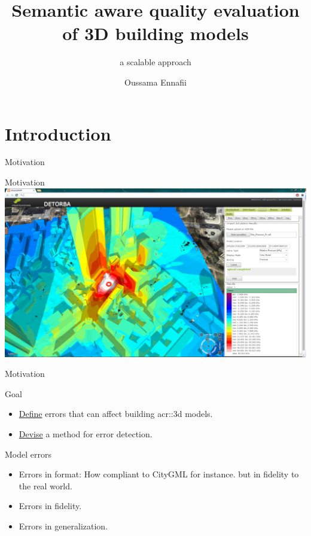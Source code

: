 \documentclass[10pt]{beamer}
\title{Semantic aware quality evaluation of 3D building models}
\subtitle{a scalable approach}
\date{\tiny \DTMdisplaydate{2020}{1}{10}{5}}
\author{
    Oussama Ennafii
}
\begin{document}
    \begin{frame}[plain]
        \titlepage{}
    \end{frame}

    \section{Introduction}        
        \begin{frame}{Motivation}
            \centering
            
        \end{frame}

        \begin{frame}{Motivation}
            \centering
            \includegraphics[width=\textwidth]{images/introduction/3d_model_applications/explosion_simulation}
        \end{frame}
        \begin{frame}{Motivation}
            \centering
        \end{frame}

        \begin{frame}{Goal}
            \begin{itemize}
                \item<1-> \underline{Define} errors that can affect building \gls{acr::3d} models.
                \item<2-> \underline{Devise} a method for error detection.
            \end{itemize}
        \end{frame}

        \begin{frame}{Model errors}
            \begin{itemize}
                \item<1-> Errors in format: How compliant to CityGML for instance.
                but in fidelity to the real world.
                \item<2-> Errors in fidelity.
                \item<3-> Errors in generalization.
            \end{itemize}
        \end{frame}
\end{document}
